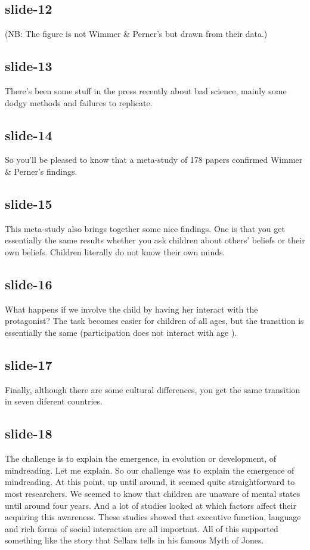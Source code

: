 \documentclass[12pt,\papersize]{extarticle}
\begin{document}
 
\subsection{slide-12}
(NB: The figure is not Wimmer \& Perner's but drawn from their data.)
 
 
\subsection{slide-13}
There's been some stuff in the press recently about bad science, mainly some dodgy methods and failures to replicate.
 
 
\subsection{slide-14}
So you'll be pleased to know that a meta-study of 178 papers confirmed Wimmer \& Perner's findings.
 
 
\subsection{slide-15}
This meta-study also brings together some nice findings.
One is that you get essentially the same results whether you ask children about others' beliefs or their own beliefs.
Children literally do not know their own minds.
 
 
\subsection{slide-16}
What happens if we involve the child by having her interact with the protagonist?
The task becomes easier for children of all ages, but the transition is essentially the same (participation does not interact with age \citealp[pp.\ 665-7]{Wellman:2001lz}).
 
 
\subsection{slide-17}
Finally, although there are some cultural differences, you get the same transition in seven diferent countries.
 
 
\subsection{slide-18}
The challenge is to explain the emergence, in evolution or development, of mindreading.
Let me explain.
So our challenge was to explain the emergence of mindreading.
At this point, up until around, it seemed quite straightforward to most researchers.
We seemed to know that children are unaware of mental states until around four years.
And a lot of studies looked at which factors affect their acquiring this awareness.
These studies showed that executive function, language and rich forms of social interaction are all important.
All of this supported something like the story that Sellars tells in his famous Myth of Jones.
 
\end{document}
